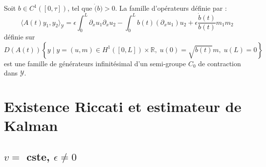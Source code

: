 \documentclass[a4paper]{article}
\newcommand{\dep}{b}
\begin{document}
 
 
 \begin{proposition}
 	\label{prop:cas3}
	Soit $b \in C^1([0,\tau])$, tel que $\dot(b)>0$.
 	La famille d'opérateurs définie par :
 	\begin{equation} 
 		\label{def:A3}
 	\langle A(t) y_1,y_2\rangle_{\mathscr{Y}} 
                                     = \epsilon \int_0^L \partial_xu_1 \partial_xu_2
		                 - \int_0^L \dep (t) (\partial_xu_1)u_2
                        +\epsilon \displaystyle \frac{\dot{\dep}(t)}{\dep(t)}m_1m_2
 	\end{equation}
 	définie sur 
	\[ D(A(t))\left\{ y \; | \; y = (u,m) \in H^1([0,L])\times \mathbb{R},
 \; u(0)=\sqrt{\dep (t)} m, \; u(L)=0 \right\} \]
	est une famille de générateurs infinitésimal
	 d'un semi-groupe $C_0$ de contraction dans $\mathscr{Y}$.
 \end{proposition}						
 

\newpage
\section{Existence Riccati et estimateur de Kalman}


\subsection{$v =$ cste, $\epsilon \ne 0$}
\end{document}
